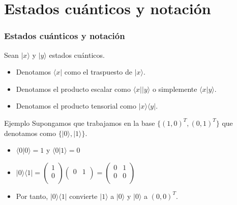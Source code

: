 \documentclass{beamer}
\newcommand{\base}[1]{|#1\rangle}
\newcommand{\lbase}[1]{\langle#1|}
\newcommand{\dotproduct}[2]{\langle#1|#2\rangle}
\newcommand{\tensor}[2]{|#1\rangle\langle#2|}
\begin{document}
\section{Estados cuánticos y notación}

\begin{frame}
	\frametitle{Estados cuánticos y notación}
	Sean $\base{x}$ y $\base{y}$ estados cuánticos.
	\begin{itemize}
	\item Denotamos $\lbase{x}$ como el traspuesto de $\base{x}$.
	\item Denotamos el producto escalar como $\lbase{x}\base{y}$ o simplemente $\dotproduct{x}{y}$.
	\item Denotamos el producto tensorial como $\tensor x y$.
	\end{itemize}
	
	\begin{block}{Ejemplo}
	Supongamos que trabajamos en la base $\{(1,0)^T, (0,1)^T\}$ que denotamos como $\{\base{0},\base{1}\}$.
	\begin{itemize}
	\item $\dotproduct 0 0 =1$ y $\dotproduct 0 1 =0$
	\item $\tensor 0 1 = \left({\begin{array}{c}   1\\0\\ \end{array} } \right)\left({\begin{array}{cc}   0 & 1\\ \end{array} } \right)=\left({\begin{array}{cc}   0 & 1\\ 0&0\\ \end{array} } \right)$
	\item Por tanto, $\tensor 0 1$ convierte $\base 1$ a $\base 0$ y $\base 0$ a $(0,0)^T$.
	\end{itemize}
	\end{block}
\end{frame}
\end{document}

